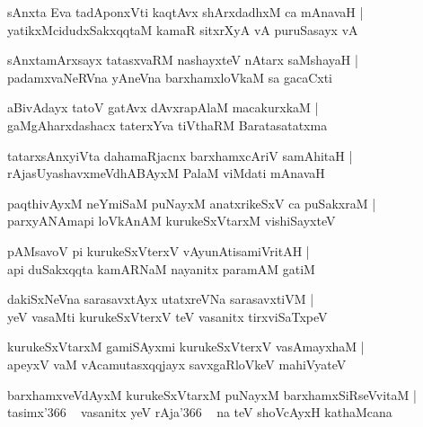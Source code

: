 \documentclass[twoside,12pt,openright]{book}
\newcounter{shloka}[chapter]
\begin{document}
\begin{shloka}
sAnxta Eva tadAponxVti kaqtAvx shArxdadhxM ca mAnavaH |\\
yatikxMcidudxSakxqqtaM kamaR sitxrXyA vA puruSasayx vA
\end{shloka}

\begin{shloka}
sAnxtamArxsayx tatasxvaRM nashayxteV nAtarx saMshayaH |\\
padamxvaNeRVna yAneVna barxhamxloVkaM sa gacaCxti 
\end{shloka}

\begin{shloka}
aBivAdayx tatoV gatAvx dAvxrapAlaM macakurxkaM |\\
gaMgAharxdashacx taterxYva tiVthaRM Baratasatatxma
\end{shloka}

\begin{shloka}
tatarxsAnxyiVta dahamaRjacnx barxhamxcAriV samAhitaH |\\
rAjasUyashavxmeVdhABAyxM PalaM viMdati mAnavaH 
\end{shloka}

\begin{shloka}
paqthivAyxM neYmiSaM puNayxM anatxrikeSxV ca puSakxraM |\\
parxyANAmapi loVkAnAM kurukeSxVtarxM vishiSayxteV 
\end{shloka}

\begin{shloka}
pAMsavoV pi kurukeSxVterxV vAyunAtisamiVritAH |\\
api duSakxqqta kamARNaM nayanitx paramAM gatiM 
\end{shloka}

\begin{shloka}
dakiSxNeVna sarasavxtAyx utatxreVNa sarasavxtiVM |\\
yeV vasaMti kurukeSxVterxV teV vasanitx tirxviSaTxpeV 
\end{shloka}

\begin{shloka}
kurukeSxVtarxM gamiSAyxmi kurukeSxVterxV vasAmayxhaM |\\
apeyxV vaM vAcamutasxqqjayx savxgaRloVkeV mahiVyateV 
\end{shloka}

\begin{shloka}
barxhamxveVdAyxM kurukeSxVtarxM puNayxM barxhamxSiRseVvitaM |\\
tasimx\char'366 ~ vasanitx yeV rAja\char'366 ~ na teV shoVcAyxH kathaMcana 
\end{shloka}
\end{document}
